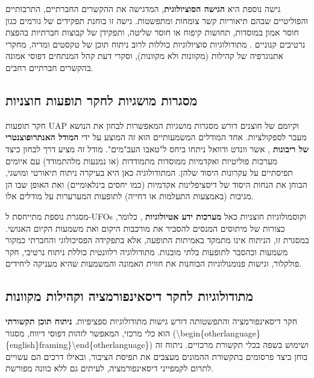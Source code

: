 \documentclass[12pt,a4paper]{article}
\begin{document}
גישה נוספת היא \textbf{הגישה הסוציולוגית}, המדגישה את ההקשרים החברתיים, התרבותיים והפוליטיים שבהם תיאוריות קשר צומחות ומתפשטות. גישה זו בוחנת תפקידים של גורמים כגון חוסר אמון במוסדות, תחושות קיפוח או חוסר שליטה, ותפקידן של קבוצות חברתיות בהפצת נרטיבים קנוניים \cite{Douglas2015, UnknownAbduction}. מתודולוגיות סוציולוגיות כוללות לרוב ניתוח תוכן של טקסטים ומדיה, מחקרי אתנוגרפיה של קהילות (מקוונות ולא מקוונות), וסקרי דעת קהל המנתחים דפוסי אמונה בהקשרים חברתיים רחבים.

\subsection{מסגרות מושגיות לחקר תופעות חוצניות}
חקר תופעות UAP וקיומם של חוצנים דורש מסגרות מושגיות המאפשרות לבחון את הנושא מעבר לספקולציות. אחד המודלים המשמעותיים הוא זה המוצע על ידי \textbf{המודל האנתרופוצנטרי של ריבונות} \cite{Wendt2008}, אשר וונדט ודוואל ניתחו ביחס ל"טאבו העב"מים". מודל זה מציע דרך לבחון כיצד מערכות פוליטיות ואקדמיות ממוסדות מתמודדות (או נמנעות מלהתמודד) עם איומים תפיסתיים על עקרונות היסוד שלהן. המתודולוגיה כאן היא בעיקרה ניתוח תיאורטי ומושגי, הבוחן את הנחות היסוד של דיסציפלינות אקדמיות (כמו יחסים בינלאומיים) ואת האופן שבו הן מגיבות (באמצעות התעלמות או דחייה) לתופעות המערערות על מודלים אלו.

מסגרת נוספת מתייחסת ל-UFOs וקוסמולוגיות חוצניות כאל \textbf{מערכות ידע אטיולוגיות} \cite{Wojcik2021Kahneman2011}, כלומר, כצורות של מיתוסים המנסים להסביר את מורכבות היקום ואת משמעות הקיום האנושי. במסגרת זו, הניתוח אינו מתמקד באמיתות התופעה, אלא בתפקידה הפסיכולוגי והחברתי כמקור משמעות וכהסבר לתופעות בלתי מובנות. מתודולוגיה רלוונטית כוללת ניתוח נרטיבי, חקר פולקלור, וגישות פנומנולוגיות הבוחנות את חווית האמונה והמשמעות שהיא מעניקה ליחידים.

\subsection{מתודולוגיות לחקר דיסאינפורמציה וקהילות מקוונות}
חקר דיסאינפורמציה והתפשטותה דורש גישות מתודולוגיות ספציפיות. \textbf{ניתוח תוכן תקשורתי} \cite{AntonVugrin2022} הוא כלי מרכזי, המאפשר לזהות דפוסי דיווח, מסגור (\textbackslash{}begin\{otherlanguage\}\{english\}framing\}\textbackslash{}end\{otherlanguage\}) ושימוש בשפה בכלי תקשורת מרכזיים. ניתוח זה בוחן כיצד פרסומים בתקשורת ההמונים מעצבים את תפיסת הציבור, ובאילו דרכים הם עשויים לתרום לקמפייני דיסאינפורמציה, לעיתים גם ללא כוונה מפורשת.
\end{document}
